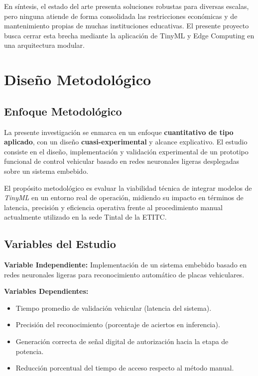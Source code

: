 \documentclass[12pt, letterpaper]{article}
\begin{document}
\vspace{4mm}
En síntesis, el estado del arte presenta soluciones robustas para diversas escalas, pero ninguna atiende de forma consolidada las restricciones económicas y de mantenimiento propias de muchas instituciones educativas. El presente proyecto busca cerrar esta brecha mediante la aplicación de TinyML y Edge Computing en una arquitectura modular.

\section{Diseño Metodológico}

\subsection{Enfoque Metodológico}
La presente investigación se enmarca en un enfoque \textbf{cuantitativo de tipo aplicado}, con un diseño \textbf{cuasi-experimental} y alcance explicativo. El estudio consiste en el diseño, implementación y validación experimental de un prototipo funcional de control vehicular basado en redes neuronales ligeras desplegadas sobre un sistema embebido.

El propósito metodológico es evaluar la viabilidad técnica de integrar modelos de \textit{TinyML} en un entorno real de operación, midiendo su impacto en términos de latencia, precisión y eficiencia operativa frente al procedimiento manual actualmente utilizado en la sede Tintal de la ETITC.

\subsection{Variables del Estudio}
\textbf{Variable Independiente:} Implementación de un sistema embebido basado en redes neuronales ligeras para reconocimiento automático de placas vehiculares.

\textbf{Variables Dependientes:}
\begin{itemize}
    \item Tiempo promedio de validación vehicular (latencia del sistema).
    \item Precisión del reconocimiento (porcentaje de aciertos en inferencia).
    \item Generación correcta de señal digital de autorización hacia la etapa de potencia.
    \item Reducción porcentual del tiempo de acceso respecto al método manual.
\end{itemize}
\end{document}
